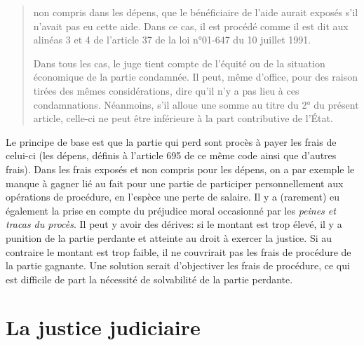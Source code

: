 \documentclass[math]{cours}
\begin{document}
\begin{description}
\begin{quote}
{\begin{enumerate}
			            non compris dans les dépens,
			            que le bénéficiaire de l'aide aurait exposés s'il n'avait pas eu cette aide.
			            Dans ce cas, il est procédé comme il est dit aux alinéas 3 et 4 de l'article 37 de la loi n°01-647 du 10 juillet 1991.
		      \end{enumerate}
		      Dans tous les cas, le juge tient compte de l'équité ou de la situation économique de la partie condamnée.
		      Il peut, même d'office, pour des raison tirées des mêmes considérations, dire qu'il n'y a pas lieu à ces condamnations.
		      Néanmoins, s'il alloue une somme au titre du 2° du présent article, celle-ci ne peut être inférieure à la part contributive de l'État.
		      }
	      \end{quote}
	      Le principe de base est que la partie qui perd sont procès à payer les frais de celui-ci (les dépens, définis à l'article 695 de ce même code ainsi que d'autres frais).
	      Dans les frais exposés et non compris pour les dépens, on a par exemple le manque à gagner lié au fait pour une partie de participer personnellement aux opérations de procédure, en l'espèce une perte de salaire.
	      Il y a (rarement) eu également la prise en compte du préjudice moral occasionné par les \textit{peines et tracas du procès}.
	      Il peut y avoir des dérives: si le montant est trop élevé, il y a punition de la partie perdante et atteinte au droit à exercer la justice.
	      Si au contraire le montant est trop faible, il ne couvrirait pas les frais de procédure de la partie gagnante.
	      Une solution serait d'objectiver les frais de procédure, ce qui est difficile de part la nécessité de solvabilité de la partie perdante.
\end{description}


\section{La justice judiciaire}
\end{document}
